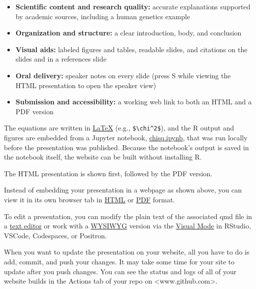 \documentclass[
  letterpaper,
  DIV=11,
  numbers=noendperiod]{scrreprt}
\providecommand{\tightlist}{%
  \setlength{\itemsep}{0pt}\setlength{\parskip}{0pt}}
\begin{document}
\begin{itemize}
\tightlist
\item
  \textbf{Scientific content and research quality:} accurate
  explanations supported by academic sources, including a human genetics
  example
\item
  \textbf{Organization and structure:} a clear introduction, body, and
  conclusion
\item
  \textbf{Visual aids:} labeled figures and tables, readable slides, and
  citations on the slides and in a references slide
\item
  \textbf{Oral delivery:} speaker notes on every slide (press S while
  viewing the HTML presentation to open the speaker view)
\item
  \textbf{Submission and accessibility:} a working web link to both an
  HTML and a PDF version
\end{itemize}

The equations are written in
\href{https://en.wikipedia.org/wiki/LaTeX\#:~:text=a\%20software\%20system\%20for\%20typesetting\%20documents}{LaTeX}
(e.g., \texttt{\$\textbackslash{}chi\^{}2\$}), and the R output and
figures are embedded from a Jupyter notebook,
\href{demo/chisq.ipynb}{chisq.ipynb}, that was run locally before the
presentation was published. Because the notebook's output is saved in
the notebook itself, the website can be built without installing R.

The HTML presentation is shown first, followed by the PDF version.

Instead of embedding your presentation in a webpage as shown above, you
can view it in its own browser tab in \href{demo/}{HTML} or
\href{demo/demo.pdf}{PDF} format.

To edit a presentation, you can modify the plain text of the associated
qmd file in a \href{https://en.wikipedia.org/wiki/Text_editor}{text
editor} or work with a
\href{https://en.wikipedia.org/wiki/WYSIWYG}{WYSIWYG} version via the
\href{https://docs.posit.co/ide/user/ide/guide/documents/visual-editor.html}{Visual
Mode} in RStudio, VSCode, Codespaces, or Positron.

When you want to update the presentation on your website, all you have
to do is add, commit, and push your changes. It may take some time for
your site to update after you push changes. You can see the status and
logs of all of your website builds in the Actions tab of your repo on
\textless www.github.com\textgreater.
\end{document}
